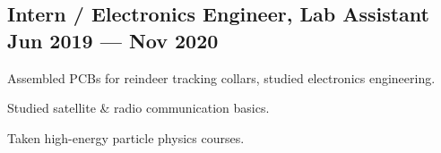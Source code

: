\documentclass[letter,10pt]{article}
\begin{document}
\subsection{{Intern / Electronics Engineer, Lab Assistant \hfill Jun 2019 --- Nov 2020}}
\begin{zitemize}
\item Assembled PCBs for reindeer tracking collars, studied electronics engineering.
\item Studied satellite \& radio communication basics.
\item Taken high-energy particle physics courses.
\end{zitemize}
\end{document}
